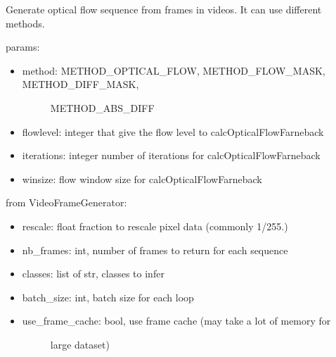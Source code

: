 \documentclass[letterpaper,10pt,english]{sphinxmanual}
\begin{document}
\begin{fulllineitems}
\label{\detokenize{index:keras_video.flow.OpticalFlowGenerator}}
Generate optical flow sequence from frames in videos. It can
use different methods.

params:
\begin{itemize}
\item {} \begin{description}
\item[{method: METHOD\_OPTICAL\_FLOW, METHOD\_FLOW\_MASK, METHOD\_DIFF\_MASK,}] \leavevmode
METHOD\_ABS\_DIFF

\end{description}

\item {} 
flowlevel: integer that give the flow level to calcOpticalFlowFarneback

\item {} 
iterations: integer number of iterations for calcOpticalFlowFarneback

\item {} 
winsize: flow window size for calcOpticalFlowFarneback

\end{itemize}

from VideoFrameGenerator:
\begin{itemize}
\item {} 
rescale: float fraction to rescale pixel data (commonly 1/255.)

\item {} 
nb\_frames: int, number of frames to return for each sequence

\item {} 
classes: list of str, classes to infer

\item {} 
batch\_size: int, batch size for each loop

\item {} \begin{description}
\item[{use\_frame\_cache: bool, use frame cache (may take a lot of memory for}] \leavevmode
large dataset)

\end{description}


\end{itemize}
\end{fulllineitems}
\end{document}
